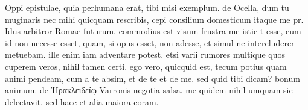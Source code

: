 


 Oppi epistulae, quia perhumana erat, tibi misi exemplum. de Ocella, dum tu muginaris nec mihi quicquam rescribis, cepi consilium domesticum itaque me pr. Idus arbitror Romae futurum. commodius est visum frustra me istic t esse, cum id non necesse esset, quam, si opus esset, non adesse, et simul ne intercluderer metuebam. ille enim iam adventare potest. etsi varii rumores multique quos cuperem veros, nihil tamen certi. ego vero, quicquid est, tecum potius quam animi pendeam, cum a te absim, et de te et de me. sed quid tibi dicam? bonum animum. de Ἡρακλειδείῳ Varronis negotia salsa. me quidem nihil umquam sic delectavit. sed haec et alia maiora coram.
